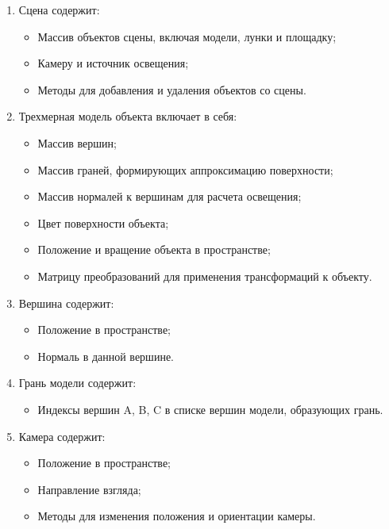 \begin{enumerate}
    \item Сцена содержит:
    
    \begin{itemize}
        \item Массив объектов сцены, включая модели, лунки и площадку;
        \item Камеру и источник освещения;
        \item Методы для добавления и удаления объектов со сцены.
    \end{itemize}
    
    \item Трехмерная модель объекта включает в себя:
    
    \begin{itemize}
        \item Массив вершин;
        \item Массив граней, формирующих аппроксимацию поверхности;
        \item Массив нормалей к вершинам для расчета освещения;
        \item Цвет поверхности объекта;
        \item Положение и вращение объекта в пространстве;
        \item Матрицу преобразований для применения трансформаций к объекту.
    \end{itemize}
    
    \item Вершина содержит:
    
    \begin{itemize}
        \item Положение в пространстве;
        \item Нормаль в данной вершине.
    \end{itemize}
    
    \item Грань модели содержит:
    
    \begin{itemize}
        \item Индексы вершин A, B, C в списке вершин модели, образующих грань.
    \end{itemize}
    
    \item Камера содержит:
    
    \begin{itemize}
        \item Положение в пространстве;
        \item Направление взгляда;
        \item Методы для изменения положения и ориентации камеры. 
    \end{itemize}
    

\end{enumerate}
